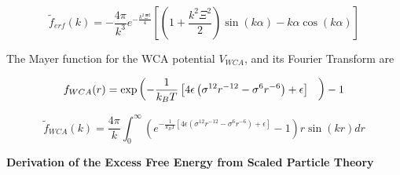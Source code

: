 \documentclass[12pt]{article}
\begin{document}
\begin{equation}\widetilde{f}_{erf}(k)=-\frac{4\pi}{k^3}e^{-\frac{k^2\Xi^2}{4}}\left[\left(1+\frac{k^2\Xi^2}{2}\right)\sin(k\alpha)-k\alpha\cos(k\alpha)\right]\end{equation} 

The Mayer function for the WCA potential $V_{WCA}$, and its Fourier Transform are


\begin{equation}f_{WCA}(r)=\operatorname{exp}\left(-\frac{1}{k_BT}\left[4\epsilon\left(\sigma^{12}r^{-12}-\sigma^{6}r^{-6}\right)+\epsilon\right]\color{white}\frac{1}{1}\color{black}\right)-1\end{equation} 

\begin{equation}\widetilde{f}_{WCA}(k)=\frac{4\pi}{k}\int_0^{\infty}{\left(e^{-\frac{1}{k_BT}\left[4\epsilon\left(\sigma^{12}r^{-12}-\sigma^{6}r^{-6}\right)+\epsilon\right]}-1\right) r\sin(kr)dr}\end{equation} 




\[{}\]
\noindent \textbf{Derivation of the Excess Free Energy from Scaled Particle Theory}
\end{document}

